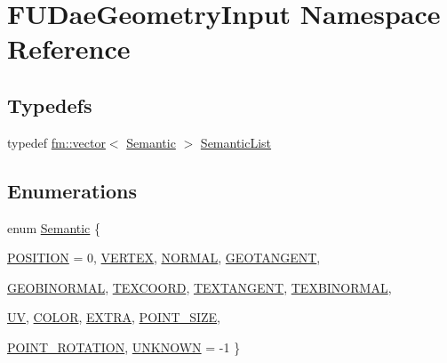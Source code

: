 \hypertarget{namespaceFUDaeGeometryInput}{
\section{FUDaeGeometryInput Namespace Reference}
\label{namespaceFUDaeGeometryInput}
}
\subsection*{Typedefs}
\begin{DoxyCompactItemize}
\item 
typedef \hyperlink{classfm_1_1vector}{fm::vector}$<$ \hyperlink{namespaceFUDaeGeometryInput_a0f887d29f54b10338ebcf73789a7a061}{Semantic} $>$ \hyperlink{namespaceFUDaeGeometryInput_a06daf7a576c27d3f2ee39c59fc63498c}{SemanticList}
\end{DoxyCompactItemize}
\subsection*{Enumerations}
\begin{DoxyCompactItemize}
\item 
enum \hyperlink{namespaceFUDaeGeometryInput_a0f887d29f54b10338ebcf73789a7a061}{Semantic} \{ \par
\hyperlink{namespaceFUDaeGeometryInput_a0f887d29f54b10338ebcf73789a7a061a565e9d374597b9e9f546575f2ea6dc94}{POSITION} =  0, 
\hyperlink{namespaceFUDaeGeometryInput_a0f887d29f54b10338ebcf73789a7a061a65c150cf03684c07ce909b8cd16ec2e0}{VERTEX}, 
\hyperlink{namespaceFUDaeGeometryInput_a0f887d29f54b10338ebcf73789a7a061a2e83b0fd623b865b622adf748614e467}{NORMAL}, 
\hyperlink{namespaceFUDaeGeometryInput_a0f887d29f54b10338ebcf73789a7a061aa2b6257327cf33897b4f0e14e7b1298a}{GEOTANGENT}, 
\par
\hyperlink{namespaceFUDaeGeometryInput_a0f887d29f54b10338ebcf73789a7a061a9147697520a27b103f9bae1d1311daf4}{GEOBINORMAL}, 
\hyperlink{namespaceFUDaeGeometryInput_a0f887d29f54b10338ebcf73789a7a061a9ecb062e2abefd034706cad81ff8cba1}{TEXCOORD}, 
\hyperlink{namespaceFUDaeGeometryInput_a0f887d29f54b10338ebcf73789a7a061ae87a7d6802a8e68dc423d18c5f8ddd6e}{TEXTANGENT}, 
\hyperlink{namespaceFUDaeGeometryInput_a0f887d29f54b10338ebcf73789a7a061a81e0fce2dddc9d9597a372442b4ae936}{TEXBINORMAL}, 
\par
\hyperlink{namespaceFUDaeGeometryInput_a0f887d29f54b10338ebcf73789a7a061a11a35a3014f2ecc9c3208080c8f5da75}{UV}, 
\hyperlink{namespaceFUDaeGeometryInput_a0f887d29f54b10338ebcf73789a7a061a311e741edb3121400cd62dcb8e312326}{COLOR}, 
\hyperlink{namespaceFUDaeGeometryInput_a0f887d29f54b10338ebcf73789a7a061a54abe870c29af1c683b477d541be9a80}{EXTRA}, 
\hyperlink{namespaceFUDaeGeometryInput_a0f887d29f54b10338ebcf73789a7a061ad05397ae138af98f3732fd9afd345d9a}{POINT\_\-SIZE}, 
\par
\hyperlink{namespaceFUDaeGeometryInput_a0f887d29f54b10338ebcf73789a7a061ae894e2f0dd91ebd96939d30d2eda0539}{POINT\_\-ROTATION}, 
\hyperlink{namespaceFUDaeGeometryInput_a0f887d29f54b10338ebcf73789a7a061acc6c0ae83a279d133ae37b1aed32f9e9}{UNKNOWN} =  -\/1
 \}
\end{DoxyCompactItemize}
